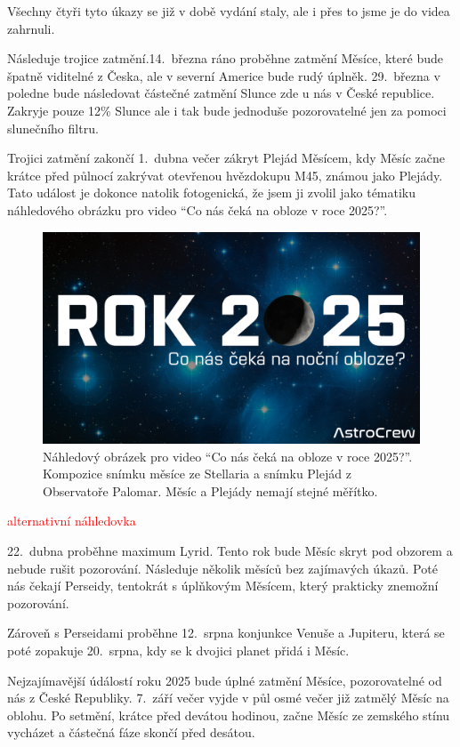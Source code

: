 \documentclass[12pt,a4paper,titlepage]{article}
\newcommand{\todo}[1]{\textcolor{red}{#1}}
\begin{document}
Všechny čtyři tyto úkazy se již v době vydání staly, ale i přes to jsme je do videa zahrnuli.

Následuje trojice zatmění.\@ 14.\ března ráno proběhne zatmění Měsíce, které bude špatně viditelné z Česka, ale v severní Americe bude rudý úplněk. 29.\ března v poledne bude následovat částečné zatmění Slunce zde u nás v České republice. Zakryje pouze 12\% Slunce ale i tak bude jednoduše pozorovatelné jen za pomoci slunečního filtru. 

Trojici zatmění zakončí 1.\ dubna večer zákryt Plejád Měsícem, kdy Měsíc začne krátce před půlnocí zakrývat otevřenou hvězdokupu M45, známou jako Plejády. Tato událost je dokonce natolik fotogenická, že jsem ji zvolil jako tématiku náhledového obrázku pro video \enquote{Co nás čeká na obloze v roce 2025?}.

\begin{figure}[H]
	\centering
	\includegraphics[width=.95\textwidth]{nahledovka-v2.jpg}
	\caption{Náhledový obrázek pro video \enquote{Co nás čeká na obloze v roce 2025?}. Kompozice snímku měsíce ze Stellaria a snímku Plejád z Observatoře Palomar. Měsíc a Plejády nemají stejné měřítko.}\label{prac:nahledovka-v2}
\end{figure}

\todo{alternativní náhledovka}

22.\ dubna proběhne maximum Lyrid. Tento rok bude Měsíc skryt pod obzorem a nebude rušit pozorování. Následuje několik měsíců bez zajímavých úkazů. Poté nás čekají Perseidy, tentokrát s úplňkovým Měsícem, který prakticky znemožní pozorování.

Zároveň s Perseidami proběhne 12.\ srpna konjunkce Venuše a Jupiteru, která se poté zopakuje 20.\ srpna, kdy se k dvojici planet přidá i Měsíc. 

Nejzajímavější údálostí roku 2025 bude úplné zatmění Měsíce, pozorovatelné od nás z České Republiky. 7.\ září večer vyjde v půl osmé večer již zatmělý Měsíc na oblohu. Po setmění, krátce před devátou hodinou, začne Měsíc ze zemského stínu vycházet a částečná fáze skončí před desátou.
\end{document}
